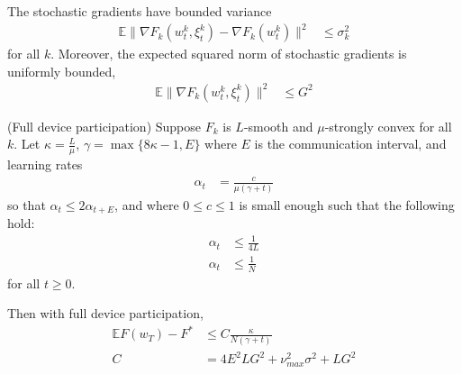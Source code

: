 %
\begin{assumption}
The stochastic gradients have bounded variance 
\begin{align*}
\mathbb{E}\|\nabla F_{k}(w_{t}^{k},\xi_{t}^{k})-\nabla F_{k}(w_{t}^{k})\|^{2} & \leq\sigma_{k}^{2}
\end{align*}
for all $k$. Moreover, the expected squared norm of stochastic gradients
is uniformly bounded, 
\begin{align*}
\mathbb{E}\|\nabla F_{k}(w_{t}^{k},\xi_{t}^{k})\|^{2} & \leq G^{2}
\end{align*}
\end{assumption}
\begin{theorem}
(Full device participation) Suppose $F_{k}$ is $L$-smooth and $\mu$-strongly
convex for all $k$. Let $\kappa=\frac{L}{\mu}$, $\gamma=\max\{8\kappa-1,E\}$
where $E$ is the communication interval, and learning rates 
\begin{align*}
\alpha_{t} & =\frac{c}{\mu(\gamma+t)}
\end{align*}
so that $\alpha_{t}\leq2\alpha_{t+E}$, and where $0\leq c\leq1$
is small enough such that the following hold: 
\begin{align*}
\alpha_{t} & \leq\frac{1}{4L}\\
\alpha_{t} & \leq\frac{1}{N}
\end{align*}
 for all $t\geq0$. 

Then with full device participation,
\begin{align*}
\mathbb{E}F(w_{T})-F^{\ast} & \leq C\frac{\kappa}{N(\gamma+t)}\\
C & =4E^{2}LG^{2}+\nu_{max}^{2}\sigma^{2}+LG^{2}
\end{align*}
 
\end{theorem}
